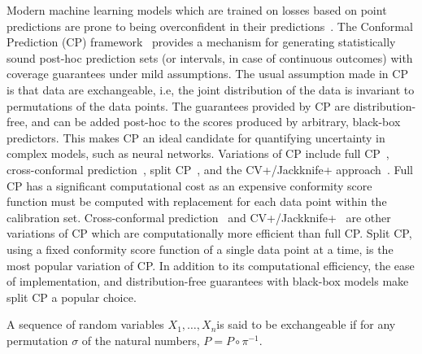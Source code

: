 Modern machine learning models which are trained on losses based on point predictions are prone to being overconfident in their predictions~\citep{guo2017calibration}. 
The Conformal Prediction (CP) framework~\citep{vovk2005algorithmic} provides a mechanism for generating statistically sound post-hoc prediction sets (or intervals, in case of continuous outcomes) with coverage guarantees under mild assumptions.
The usual assumption made in CP is that data are exchangeable, i.e, the joint distribution of the data is invariant to permutations of the data points.
The guarantees provided by CP are distribution-free, and can be added post-hoc to the scores produced by arbitrary, black-box predictors.
This makes CP an ideal candidate for quantifying uncertainty in complex models, such as neural networks.
Variations of CP include full CP~\citep{vovk2005algorithmic}, cross-conformal prediction~\citep{vovk2005algorithmic}, split CP~\citep{vovk2005algorithmic}, and the CV+/Jackknife+ approach~\citep{barber2021predictive}.
Full CP has a significant computational cost as an expensive conformity score function must be computed with replacement for each data point within the calibration set.
Cross-conformal prediction~\citep{vovk2015cross} and CV+/Jackknife+~\citep{barber2021predictive} are other variations of CP which are computationally more efficient than full CP.
Split CP, using a fixed conformity score function of a single data point at a time, is the most popular variation of CP.
In addition to its computational efficiency, the ease of implementation, and distribution-free guarantees with black-box models make split CP a popular choice.
\begin{definition}
    A sequence of random variables $X_1, \dots, X_n$is said to be exchangeable if for any permutation $\sigma$ of the natural numbers, $P = P \circ \pi^{-1}$.
\end{definition}

